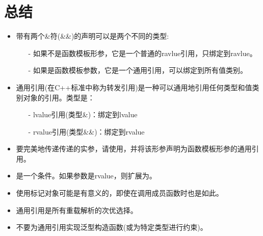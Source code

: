 \section{总结}
\begin{itemize}
	\item 带有两个\&符(\&\&)的声明可以是两个不同的类型:
	\begin{itemize}
		\item[-] 如果不是函数模板形参，它是一个普通的ravlue引用，只绑定到ravlue。
		\item[-] 如果是函数模板参数，它是一个通用引用，可以绑定到所有值类别。
	\end{itemize}
	\item 通用引用(在C++标准中称为转发引用)是一种可以通用地引用任何类型和值类别对象的引用。类型是：
		\begin{itemize}
		\item[-] lvalue引用(类型\&)：绑定到lvalue
		\item[-] rvalue引用(类型\&\&)：绑定到rvalue
	\end{itemize}
	\item 要完美地传递传递的实参，请使用，并将该形参声明为函数模板形参的通用引用。
	\item {}是一个条件。如果参数是rvalue，则扩展为。
	\item 使用标记对象可能是有意义的，即使在调用成员函数时也是如此。
	\item 通用引用是所有重载解析的次优选择。
	\item 不要为通用引用实现泛型构造函数(或为特定类型进行约束)。
\end{itemize}


